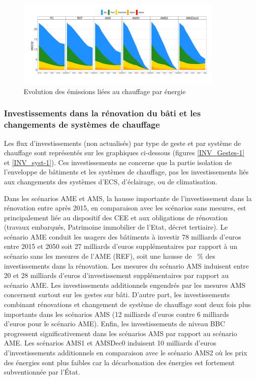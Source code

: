 \documentclass[10.5pt,a4paper]{article}
\begin{document}
{\begin{figure}[ht!]
\centering 
\caption{Evolution des émissions liées au chauffage par énergie}\label{Evol_Em_energie_chauffage-1}  
\includegraphics[width = 0.9\textwidth]{Evol_Em_energie_chauffage-1}  
\end{figure}

\clearpage

\subsubsection{Investissements dans la rénovation du bâti et les changements de systèmes de chauffage}

Les flux d'investissements (non actualisés) par type de geste et par système de chauffage sont représentés sur les graphiques ci-dessous (figures \ref{INV_Gestes-1} et \ref{INV_syst-1}). Ces investissements ne concerne que la partie isolation de l'enveloppe de bâtiments et les systèmes de chauffage, pas les investissements liés aux changements des systèmes d'ECS, d'éclairage, ou de climatisation. 

Dans les scénarios AME et AMS, la hausse importante de l'investissement dans la rénovation entre après 2015, en comparaison avec les scénarios sans mesures, est principalement liée au dispositif des CEE et aux obligations de rénovation (travaux embarqués, Patrimoine immobilier de l’Etat, décret tertiaire). 
Le scénario AME conduit les usagers des bâtiments à investir 78 milliards d’euros entre 2015 et 2050 soit 27 milliards d'euros supplémentaires par rapport à un scénario sans les mesures de l'AME (REF), soit une hausse de ~\% des investissements dans la rénovation. Les mesures du scénario AMS induisent entre 20 et 28 milliards d’euros d’investissement supplémentaires par rapport au scénario AME. Les investissements additionnels engendrés par les mesures AMS concernent surtout sur les gestes sur bâti. D'autre part, les investissements combinant rénovations et changement de système de chauffage sont deux fois plus importants dans les scénarios AMS (12 milliards d’euros contre 6 milliards d’euros pour le scénario AME). Enfin, les investissements de niveau BBC progressent significativement dans les scénarios AMS par rapport au scénario AME. Les scénarios AMS1 et AMSDec0 induisent 10 milliards d'euros d'investissements additionnels en comparaison avec le scénario AMS2 où les prix des énergies sont plus faibles car la décarbonation des énergies est fortement subventionnée par l’État.

}
\end{document}
